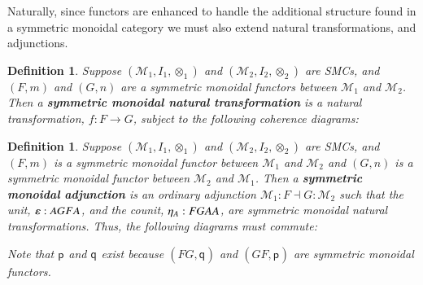 \documentclass{lmcs}
\newtheorem{definition}[theorem]{Definition}
\let\mto\to
\let\to\relax
\newcommand{\to}{\rightarrow}
\newcommand{\cat}[1]{\mathcal{#1}}
\newcommand{\p}[1]{\mathsf{p}_{#1}}
\newcommand{\q}[1]{\mathsf{q}_{#1}}
\begin{document}
Naturally, since functors are enhanced to handle the additional
structure found in a symmetric monoidal category we must also extend
natural transformations, and adjunctions.
\begin{definition}
  \label{def:SMCNAT}
  Suppose $(\cat{M}_1,I_1,\otimes_1)$ and $(\cat{M}_2,I_2,\otimes_2)$
  are SMCs, and $(F,m)$ and $(G,n)$ are a symmetric monoidal functors
  between $\cat{M}_1$ and $\cat{M}_2$.  Then a \textbf{symmetric
    monoidal natural transformation} is a natural transformation,
  $f : F \mto G$, subject to the following coherence diagrams:
\end{definition}  
\begin{definition}
  \label{def:SMCADJ}
  Suppose $(\cat{M}_1,I_1,\otimes_1)$ and $(\cat{M}_2,I_2,\otimes_2)$
  are SMCs, and $(F,m)$ is a symmetric monoidal functor between
  $\cat{M}_1$ and $\cat{M}_2$ and $(G,n)$ is a symmetric monoidal
  functor between $\cat{M}_2$ and $\cat{M}_1$.  Then a
  \textbf{symmetric monoidal adjunction} is an ordinary adjunction
  $\cat{M}_1 : F \dashv G : \cat{M}_2$ such that the unit,
  $\varepsilon : A \to GFA$, and the counit, $\eta_A : FGA \to A$, are
  symmetric monoidal natural transformations.  Thus, the following
  diagrams must commute:
  Note that $\p{}$ and $\q{}$ exist because $(FG,\q{})$ and
  $(GF,\p{})$ are symmetric monoidal functors.
\end{definition}
\end{document}
